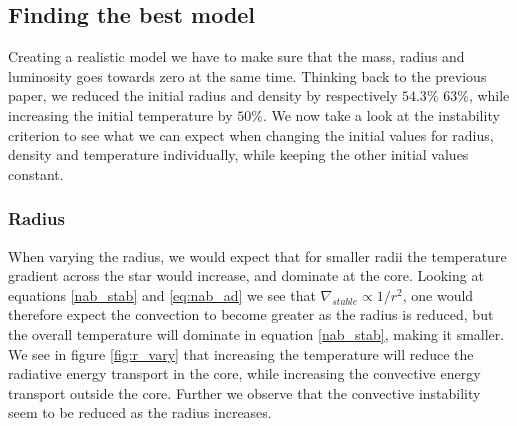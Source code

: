 \documentclass[a4paper,10pt]{article}
\begin{document}
\subsection{Finding the best model}
Creating a realistic model we have to make sure that the mass, radius and luminosity goes towards zero at the same time. Thinking back to the previous paper, we reduced the initial radius and density by respectively $54.3\%$ $63\%$, while increasing the initial temperature by $50\%$. We now take a look at the instability criterion to see what we can expect when changing the initial values for radius, density and temperature individually, while keeping the other initial values constant.

\subsubsection{Radius}
When varying the radius, we would expect that for smaller radii the temperature gradient across the star would increase, and dominate at the core. Looking at equations \eqref{nab_stab} and \eqref{eq:nab_ad} we see that $\nabla_{stable} \propto 1/r^2$, one would therefore expect the convection to become greater as the radius is reduced, but the overall temperature will dominate in equation \eqref{nab_stab}, making it smaller. We see in figure \ref{fig:r_vary} that increasing the temperature will reduce the radiative energy transport in the core, while increasing the convective energy transport outside the core. Further we observe that the convective instability seem to be reduced as the radius increases.
\end{document}
